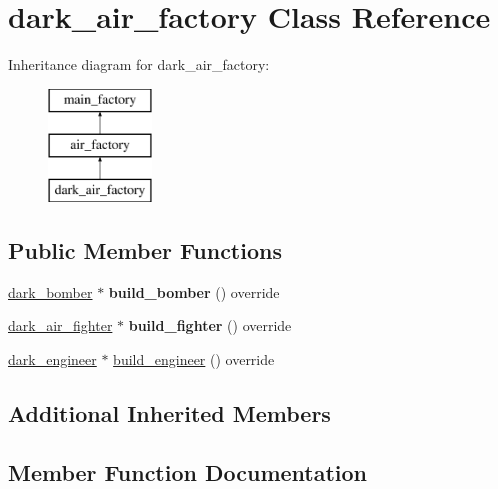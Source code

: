 \hypertarget{classdark__air__factory}{}\section{dark\+\_\+air\+\_\+factory Class Reference}
\label{classdark__air__factory}
Inheritance diagram for dark\+\_\+air\+\_\+factory\+:\begin{figure}[H]
\begin{center}
\leavevmode
\includegraphics[height=3.000000cm]{classdark__air__factory}
\end{center}
\end{figure}
\subsection*{Public Member Functions}
\begin{DoxyCompactItemize}
\item 
\mbox{\label{classdark__air__factory_a2d621db522bf5712d3adfecc5f8dfc80}} 
\mbox{\hyperlink{classdark__bomber}{dark\+\_\+bomber}} $\ast$ {\bfseries build\+\_\+bomber} () override
\item 
\mbox{\label{classdark__air__factory_a66b398b461de02ff27e140e689503dfd}} 
\mbox{\hyperlink{classdark__air__fighter}{dark\+\_\+air\+\_\+fighter}} $\ast$ {\bfseries build\+\_\+fighter} () override
\item 
\mbox{\hyperlink{classdark__engineer}{dark\+\_\+engineer}} $\ast$ \mbox{\hyperlink{classdark__air__factory_aaabd99e42553b5514b2fae2967bc3248}{build\+\_\+engineer}} () override
\end{DoxyCompactItemize}
\subsection*{Additional Inherited Members}


\subsection{Member Function Documentation}
\mbox{\label{classdark__air__factory_aaabd99e42553b5514b2fae2967bc3248}} 
